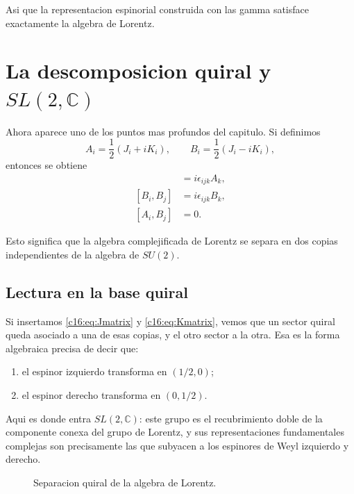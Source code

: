 Asi que la representacion espinorial construida con las gamma satisface exactamente la algebra de Lorentz.

\section{\texorpdfstring{La descomposicion quiral y \(SL(2,\mathbb{C})\)}{La descomposicion quiral y SL(2,C)}}
Ahora aparece uno de los puntos mas profundos del capitulo. Si definimos
\begin{equation}
A_i = \frac{1}{2}(J_i+iK_i),
\qquad
B_i = \frac{1}{2}(J_i-iK_i),
\label{c16:eq:AB}
\end{equation}
entonces se obtiene
\begin{align}
[A_i,A_j] &= i\epsilon_{ijk}A_k,\\
[B_i,B_j] &= i\epsilon_{ijk}B_k,\\
[A_i,B_j] &= 0.
\label{c16:eq:su2su2}
\end{align}

Esto significa que la algebra complejificada de Lorentz se separa en dos copias independientes de la algebra de \(SU(2)\).

\subsection{Lectura en la base quiral}
Si insertamos \eqref{c16:eq:Jmatrix} y \eqref{c16:eq:Kmatrix}, vemos que un sector quiral queda asociado a una de esas copias, y el otro sector a la otra. Esa es la forma algebraica precisa de decir que:
\begin{enumerate}[label=\arabic*.]
    \item el espinor izquierdo transforma en \((1/2,0)\);
    \item el espinor derecho transforma en \((0,1/2)\).
\end{enumerate}

Aqui es donde entra \(SL(2,\mathbb{C})\): este grupo es el recubrimiento doble de la componente conexa del grupo de Lorentz, y sus representaciones fundamentales complejas son precisamente las que subyacen a los espinores de Weyl izquierdo y derecho.

\begin{figure}[h!]
\centering
{}
\caption{Separacion quiral de la algebra de Lorentz.}
\end{figure}

